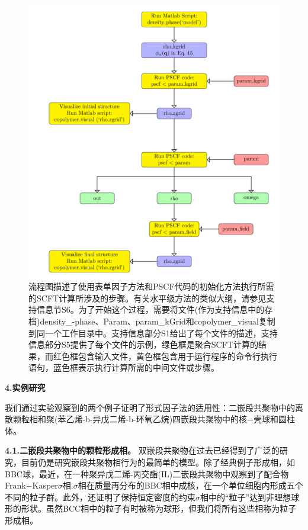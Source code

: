 \documentclass[12pt，a4paper]{article}
\numberwithin{equation}{section}
\begin{document}
\begin{figure}[H]
\centering
\includegraphics[scale=0.5]{./figures/3.png}
\caption{流程图描述了使用表单因子方法和PSCF代码的初始化方法执行所需的SCFT计算所涉及的步骤。有关水平级方法的类似大纲，请参见支持信息节S6。为了开始这个过程，需要将文件(作为支持信息中的存档)density\_-phase、Param、param\_kGrid和copolymer\_visual复制到同一个工作目录中。支持信息部分S1给出了每个文件的描述，支持信息部分S5提供了每个文件的示例，绿色框是聚合SCFT计算的结果，而红色框包含输入文件，黄色框包含用于运行程序的命令行执行语句，蓝色框表示执行计算所需的中间文件或步骤。}
\label{图3}
\end{figure}

\textbf{4.实例研究}

我们通过实验观察到的两个例子证明了形式因子法的适用性：二嵌段共聚物中的离散颗粒相和聚(苯乙烯-b-异戊二烯-b-环氧乙烷)四嵌段共聚物中的核−壳球和圆柱体。

\textbf{4.1.二嵌段共聚物中的颗粒形成相。}
双嵌段共聚物在过去已经得到了广泛的研究，目前仍是研究嵌段共聚物相行为的最简单的模型。除了经典例子形成相，如BBC球，最近，在一种聚异戊二烯-丙交酯(IL)二嵌段共聚物中观察到了配合物Frank−Kasper$\sigma$相.$\sigma$相在质量再分布的BBC相中成核，在一个单位细胞内形成五个不同的粒子群。此外，还证明了保持恒定密度的约束$\sigma$相中的“粒子”达到非理想球形的形状。虽然BCC相中的粒子有时被称为球形，但我们将所有这些相称为粒子形成相。
\end{document}
